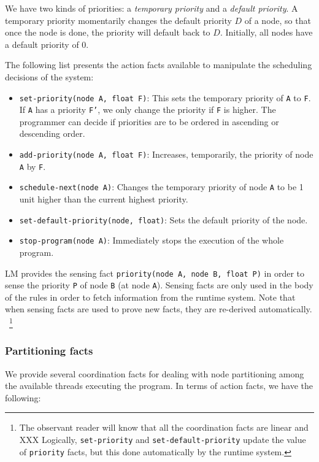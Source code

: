 We have two kinds of priorities: a \emph{temporary priority} and a \emph{default
priority}. A temporary priority momentarily changes the default priority $D$ of a
node, so that once the node is done, the priority will default back to $D$.
Initially, all nodes have a default priority of $0$.

The following list presents the action facts available to manipulate the scheduling
decisions of the system:

\newcommand{\code}[1]{\texttt{\small{#1}}}

\begin{itemize}
   \item \code{set-priority(node A, float F)}: This sets the
   temporary priority of \texttt{A} to \texttt{F}. If \texttt{A} has a priority
   \texttt{F'}, we only change the priority if \texttt{F} is higher. The programmer
   can decide if priorities are to be ordered in ascending or descending order.
   \item \code{add-priority(node A, float F)}: Increases,
   temporarily, the priority of node \texttt{A} by \texttt{F}.
   \item \code{schedule-next(node A)}: Changes the temporary priority of node
   \texttt{A} to be 1 unit higher than the current highest priority.
   \item \code{set-default-priority(node, float)}: Sets the default
   priority of the node.
   \item \code{stop-program(node A)}: Immediately stops the
   execution of the whole program.
\end{itemize}

LM provides the sensing fact \code{priority(node A, node B, float P)} in order to sense the
priority \texttt{P} of node \texttt{B} (at node \texttt{A}).
Sensing facts are only used in the body of the rules in order
to fetch information from the runtime system.
Note that when sensing facts are used to prove new facts, they are re-derived automatically.
~\footnote{The observant reader will know that all the coordination facts are
   linear and XXX
Logically, \texttt{set-priority} and \texttt{set-default-priority} update the
value of \texttt{priority} facts, but this done automatically by the runtime
system.}

\subsubsection{Partitioning facts}

We provide several coordination facts for dealing with node partitioning among
the available threads executing the program. In terms of action
facts, we have the following:


